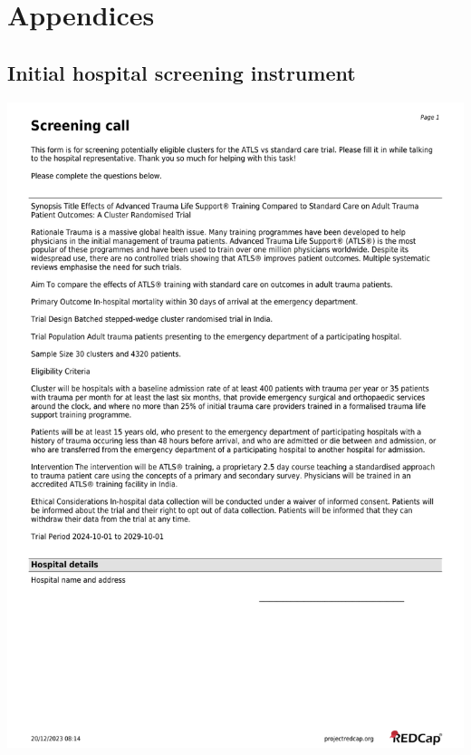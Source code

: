 \documentclass[
]{scrartcl}
\begin{document}
\hypertarget{appendices}{%
\section{Appendices}\label{appendices}}

\hypertarget{sec-appendix-hospital-screening-instrument}{%
\subsection{Initial hospital screening
instrument}\label{sec-appendix-hospital-screening-instrument}}

\includegraphics{./appendices/hospital-screening-instrument/hospital-screening-instrument-1.pdf}
\end{document}
